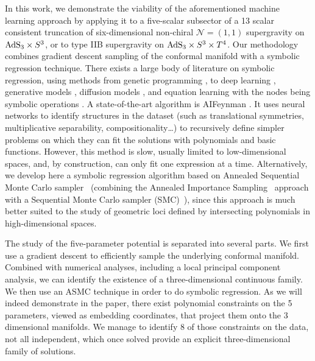 \documentclass[11pt,a4paper]{article}
\begin{document}
In this work, we demonstrate the viability of the aforementioned machine learning approach by applying it to a five-scalar subsector of a 13 scalar consistent truncation of six-dimensional non-chiral $\mathcal{N} = (1,1)$ supergravity on ${\rm AdS}_3 \times S^3$, or to type IIB supergravity on ${\rm AdS}_3 \times S^3 \times T^4$. Our methodology combines gradient descent sampling of the conformal manifold with a symbolic regression technique. There exists a large body of literature on symbolic regression, using methods from genetic programming \cite{koza1994genetic,virgolin2021improving,randall2022bingo,burlacu2019parsimony}, to deep learning \cite{petersen2019deep,kamienny2022end}, generative models \cite{valipour2021symbolicgpt}, diffusion models \cite{bastiani2025diffusion}, and equation learning with the nodes being symbolic operations \cite{2018arXiv180607259S}. A state-of-the-art algorithm is AIFeynman \cite{Udrescu:2019mnk}. It uses neural networks to identify structures in the dataset (such as translational symmetries, multiplicative separability, compositionality\dots) to recursively define simpler problems on which they can fit the solutions with polynomials and basic functions.  However, this method is slow, usually limited to low-dimensional spaces, and, by construction, can only fit one expression at a time. Alternatively, we develop here a symbolic regression algorithm based on Annealed Sequential Monte Carlo sampler~\cite{zimmermann2021nested,syed2024optimisedannealedsequentialmonte} (combining the Annealed Importance Sampling~\cite{neal1998annealedimportancesampling} approach with a Sequential Monte Carlo sampler (SMC)~\cite{del2006sequential}), since this approach is much better suited to the study of geometric loci defined by intersecting polynomials in high-dimensional spaces.


The study of the five-parameter potential is separated into several parts. We first use a gradient descent to efficiently sample the underlying conformal manifold. Combined with numerical analyses, including a local principal component analysis, we can identify the existence of a three-dimensional continuous family. We then use an ASMC technique in order to do symbolic regression. As we will indeed demonstrate in the paper, there exist polynomial constraints on the 5 parameters, viewed as embedding coordinates, that project them onto the 3 dimensional manifolds. We manage to identify 8 of those constraints on the data, not all independent, which once solved  provide an explicit three-dimensional family of solutions.
\end{document}
